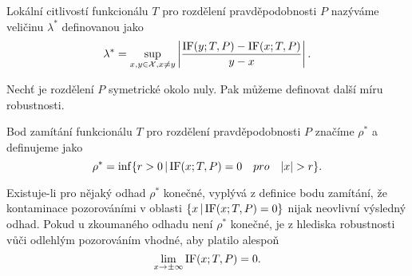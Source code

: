 \begin{definition}
	Lokální citlivostí funkcionálu $T$ pro rozdělení pravděpodobnosti $P$ nazýváme veličinu $\lambda^*$ definovanou jako
	\begin{equation}
			\lambda^* = \sup_{x,y \in \mathcal{X},x \neq y}  \left| \frac{\mathrm{IF}({y};T,P) - \mathrm{IF}({x};T,P)}{y-x} \right|.
	\end{equation}
\end{definition}

\noindent Nechť je rozdělení $P$ symetrické okolo nuly. Pak můžeme definovat další míru robustnosti.

\begin{definition}
	Bod zamítání funkcionálu $T$ pro rozdělení pravděpodobnosti $P$ značíme $\rho^*$ a definujeme jako
	\begin{equation}
			\rho^* = \inf \lbrace r>0 \, | \, \mathrm{IF}({x};T,P) = 0 \quad pro \quad |x| > r\rbrace.
	\end{equation}
\end{definition}

\noindent Existuje-li pro nějaký odhad $\rho^*$ konečné, vyplývá z definice bodu zamítání, že kontaminace pozorováními v oblasti $\lbrace x \, | \, \mathrm{IF}({x};T,P) = 0 \rbrace$ nijak neovlivní výsledný odhad. Pokud u zkoumaného odhadu není $\rho^*$ konečné, je z hlediska robustnosti vůči odlehlým pozorováním vhodné, aby platilo alespoň
\begin{equation}
	\lim_{x \rightarrow \pm\infty} \mathrm{IF}({x};T,P) = 0.
\end{equation}


